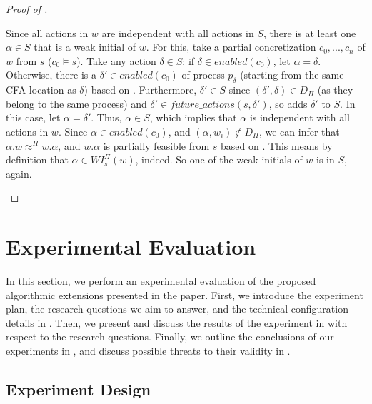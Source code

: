 \documentclass[numbook]{svjour3}
\begin{document}
\begin{proof}[Proof of ]
\begin{enumerate}
		Since all actions in $w$ are independent with all actions in $S$, there is at least one $\alpha \in S$ that is a weak initial of $w$. For this, take a partial concretization $c_0,...,c_n$ of $w$ from $s$ ($c_0 \models s$). Take any action $\delta \in S$: if $\delta \in \mathit{enabled}(c_0)$, let $\alpha = \delta$. Otherwise, there is a $\delta' \in \mathit{enabled}(c_0)$ of process $p_\delta$ (starting from the same CFA location as $\delta$) based on . Furthermore, $\delta' \in S$ since $(\delta', \delta) \in D_\Pi$ (as they belong to the same process) and $\delta' \in \mathit{future\_actions}(s, \delta')$, so  adds $\delta'$ to $S$. In this case, let $\alpha = \delta'$. Thus, $\alpha \in S$, which implies that $\alpha$ is independent with all actions in $w$. Since $\alpha \in \mathit{enabled}(c_0)$, and $(\alpha, w_i) \notin D_\Pi$, we can infer that $\alpha.w \approx^\Pi w.\alpha$, and $w.\alpha$ is partially feasible from $s$ based on . This means by definition that $\alpha \in \mathit{WI}_s^\Pi(w)$, indeed. So one of the weak initials of $w$ is in $S$, again.
	\end{enumerate}
\end{proof}

\section{Experimental Evaluation}
\label{sec:por-experiments}

In this section, we perform an experimental evaluation of the proposed algorithmic extensions presented in the paper. First, we introduce the experiment plan, the research questions we aim to answer, and the technical configuration details in . Then, we present and discuss the results of the experiment in  with respect to the research questions. Finally, we outline the conclusions of our experiments in , and discuss possible threats to their validity in .

\subsection{Experiment Design}
\label{sec:por-planning}
\end{document}
